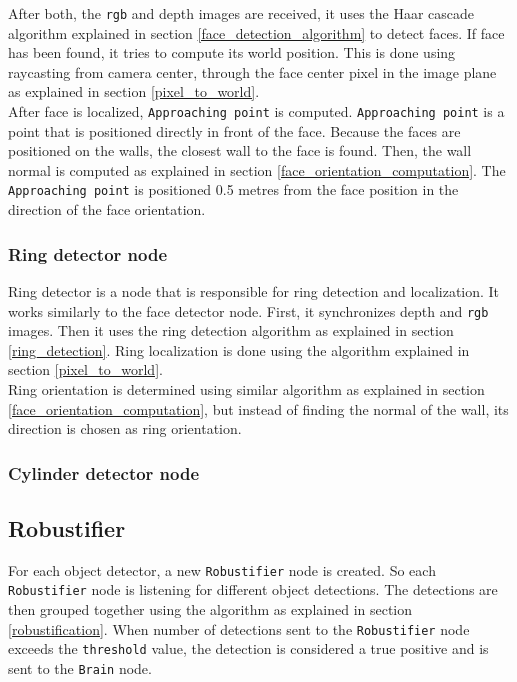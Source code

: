 \documentclass[12pt,a4paper]{article}
\begin{document}
	After both, the \texttt{rgb} and depth images are received, it uses the Haar cascade algorithm explained in section \ref{face_detection_algorithm} to detect faces. If face has been found, it tries to compute its world position. This is done using raycasting from camera center, through the face center pixel in the image plane as explained in section \ref{pixel_to_world}. \\

	After face is localized, \texttt{Approaching point} is computed. \texttt{Approaching point} is a point that is positioned directly in front of the face. Because the faces are positioned on the walls, the closest wall to the face is found. Then, the wall normal is computed as explained in section \ref{face_orientation_computation}. The \texttt{Approaching point} is positioned 0.5 metres from the face position in the direction of the face orientation. \\

	\subsubsection{Ring detector node}
	Ring detector is a node that is responsible for ring detection and localization. It works similarly to the face detector node. First, it synchronizes depth and \texttt{rgb} images. Then it uses the ring detection algorithm as explained in section \ref{ring_detection}. Ring localization is done using the algorithm explained in section \ref{pixel_to_world}. \\
	
	Ring orientation is determined using similar algorithm as explained in section \ref{face_orientation_computation}, but instead of finding the normal of the wall, its direction is chosen as ring orientation. \\ %
	
	\subsubsection{Cylinder detector node}

	\subsection{Robustifier}
	For each object detector, a new \texttt{Robustifier} node is created. So each \texttt{Robustifier} node is listening for different object detections. The detections are then grouped together using the algorithm as explained in section \ref{robustification}. When number of detections sent to the \texttt{Robustifier} node exceeds the \texttt{threshold} value, the detection is considered a true positive and is sent to the \texttt{Brain} node. \\
	
\end{document}
